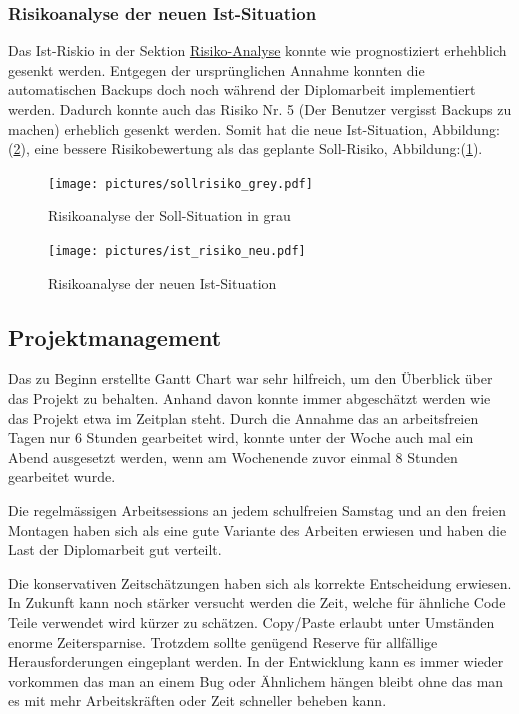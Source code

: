 \subsubsection{Risikoanalyse der neuen Ist-Situation}
\label{sec:orgc98cda5}

Das Ist-Riskio in der Sektion \hyperref[sec:org2347925]{Risiko-Analyse} konnte
wie prognostiziert erhehblich gesenkt werden. Entgegen der ursprünglichen
Annahme konnten die automatischen Backups doch noch während der Diplomarbeit
implementiert werden. Dadurch konnte auch das Risiko Nr. 5 (Der Benutzer
vergisst Backups zu machen) erheblich gesenkt werden. Somit hat die neue
Ist-Situation, Abbildung:(\ref{fig:org47eb5a8}), eine bessere Risikobewertung
als das geplante Soll-Risiko, Abbildung:(\ref{fig:sollgrau}).

\begin{figure}
\centering
\texttt{[image: pictures/sollrisiko\_grey.pdf]}
\caption{\label{fig:sollgrau}
Risikoanalyse der Soll-Situation in grau}
\end{figure}

\begin{figure}
\centering
\texttt{[image: pictures/ist\_risiko\_neu.pdf]}
\caption{\label{fig:org47eb5a8}
Risikoanalyse der neuen Ist-Situation}
\end{figure}

\subsection{Projektmanagement}
\label{sec:orgb68b222}

Das zu Beginn erstellte Gantt Chart war sehr hilfreich, um den Überblick über
das Projekt zu behalten. Anhand davon konnte immer abgeschätzt werden wie das
Projekt etwa im Zeitplan steht. Durch die Annahme das an arbeitsfreien Tagen
nur 6 Stunden gearbeitet wird, konnte unter der Woche auch mal ein Abend
ausgesetzt werden, wenn am Wochenende zuvor einmal 8 Stunden gearbeitet wurde.

Die regelmässigen Arbeitsessions an jedem schulfreien Samstag und an den freien
Montagen haben sich als eine gute Variante des Arbeiten erwiesen und haben die
Last der Diplomarbeit gut verteilt.

Die konservativen Zeitschätzungen haben sich als korrekte Entscheidung
erwiesen. In Zukunft kann noch stärker versucht werden die Zeit, welche für
ähnliche Code Teile verwendet wird kürzer zu schätzen. Copy/Paste erlaubt unter
Umständen enorme Zeitersparnise. Trotzdem sollte genügend Reserve für
allfällige Herausforderungen eingeplant werden. In der Entwicklung kann es
immer wieder vorkommen das man an einem Bug oder Ähnlichem hängen bleibt ohne
das man es mit mehr Arbeitskräften oder Zeit schneller beheben kann.

